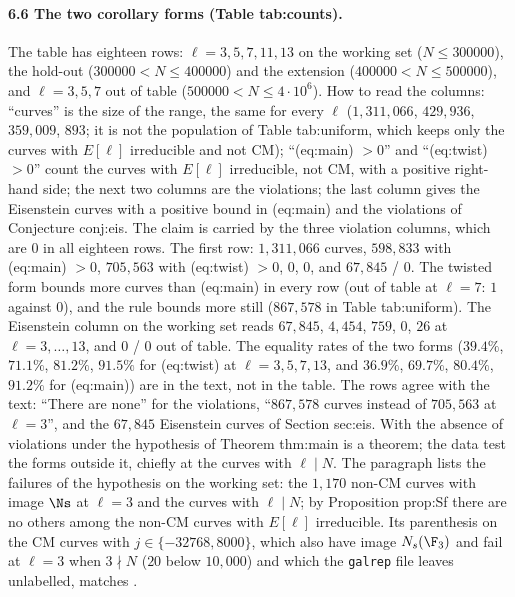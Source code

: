 \begin{sloppypar}
\paragraph{6.6 The two corollary forms (Table tab:counts).} The table has eighteen rows: $\ell=3,5,7,11,13$ on the working set ($N\le300000$), the hold-out
($300000<N\le400000$) and the extension ($400000<N\le500000$), and $\ell=3,5,7$ out of table ($500000<N\le4\cdot10^6$). How to read the columns: ``curves'' is the size of the
range, the same for every $\ell$ ($1{,}311{,}066$, $429{,}936$, $359{,}009$, $893$; it is not the population of Table tab:uniform, which keeps only the curves with $E[\ell]$
irreducible and not CM); ``(eq:main) $>0$'' and ``(eq:twist) $>0$'' count the curves with $E[\ell]$ irreducible, not CM, with a positive right-hand side; the next two columns are
the violations; the last column gives the Eisenstein curves with a positive bound in (eq:main) and the violations of Conjecture conj:eis. The claim is carried by the three
violation columns, which are $0$ in all eighteen rows. The first row: $1{,}311{,}066$ curves, $598{,}833$ with (eq:main) $>0$, $705{,}563$ with (eq:twist) $>0$, $0$, $0$, and
$67{,}845$ / $0$. The twisted form bounds more curves than (eq:main) in every row (out of table at $\ell=7$: $1$ against $0$), and the rule bounds more still ($867{,}578$ in
Table tab:uniform). The Eisenstein column on the working set reads $67{,}845$, $4{,}454$, $759$, $0$, $26$ at $\ell=3,\dots,13$, and $0$ / $0$ out of table. The equality rates
of the two forms ($39.4\%$, $71.1\%$, $81.2\%$, $91.5\%$ for (eq:twist) at $\ell=3,5,7,13$, and $36.9\%$, $69.7\%$, $80.4\%$, $91.2\%$ for (eq:main)) are in the text, not in the
table. The rows agree with the text: ``There are none'' for the violations, ``$867{,}578$ curves instead of $705{,}563$ at $\ell=3$'', and the $67{,}845$ Eisenstein curves of
Section sec:eis. With
 the absence of violations under the hypothesis of Theorem thm:main is a theorem; the data test the forms outside it, chiefly at the curves with $\ell\mid N$. The
paragraph lists the failures of the hypothesis on the working set: the $1{,}170$ non-CM curves with image $\Ns$ at $\ell=3$ and the curves with $\ell\mid N$; by Proposition prop:Sf there are no
others among the non-CM curves with $E[\ell]$ irreducible. Its parenthesis on the CM curves with $j\in\{-32768,8000\}$, which also have image $N_s(\F_3)$ and fail at $\ell=3$ when $3\nmid N$
($20$ below $10{,}000$) and which the \texttt{galrep} file leaves unlabelled, matches .


\end{sloppypar}
